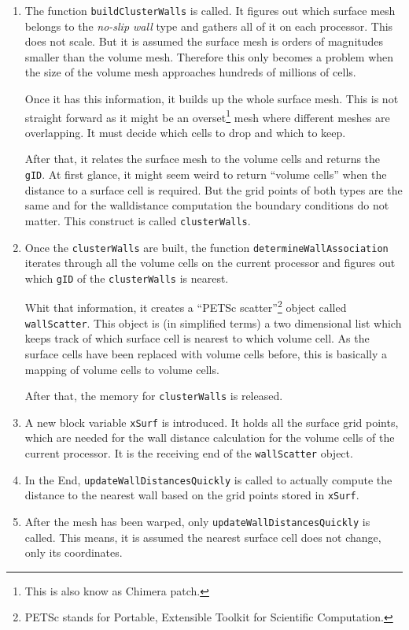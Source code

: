 \begin{enumerate}
  \item The function \texttt{buildClusterWalls} is called. It figures out which
surface mesh belongs to the \textit{no-slip wall} type and gathers all of it on
each processor. This does not scale. But it is assumed the surface mesh is
orders of magnitudes smaller than the volume mesh. Therefore this only becomes a
problem when the size of the volume mesh approaches hundreds of millions of
cells.

Once it has this information, it builds up the whole surface mesh. This is not
straight forward as it might be an overset\footnote{This is also know as Chimera
patch.} mesh where different meshes are overlapping. It must decide
which cells to drop and which to keep.

After that, it relates the surface mesh to the volume cells and returns the
\texttt{gID}. At first glance, it might seem weird to return ``volume cells''
when the distance to a surface cell is required. But the grid points of both
types are the same and for the walldistance computation the boundary conditions
do not matter. This construct is called \texttt{clusterWalls}.

  \item Once the \texttt{clusterWalls} are built, the function
\texttt{determineWallAssociation} iterates through all the volume cells on the
current processor and figures out which \texttt{gID} of the
\texttt{clusterWalls} is nearest.

Whit that information, it creates a ``PETSc scatter''\footnote{PETSc stands for
Portable, Extensible Toolkit for Scientific Computation.} object called
\texttt{wallScatter}. This object is (in simplified terms) a two dimensional
list which keeps track of which surface cell is nearest to which volume cell. As
the surface cells have been replaced with volume cells before, this is basically
a mapping of volume cells to volume cells.

After that, the memory for \texttt{clusterWalls} is released.

\item A new block variable \texttt{xSurf} is introduced. It holds all the
surface grid points, which are needed for the wall distance calculation for the
volume cells of the current processor. It is the receiving end of the
\texttt{wallScatter} object.

\item In the End, \texttt{updateWallDistancesQuickly} is called to actually
compute the distance to the nearest wall based on the grid points stored in
\texttt{xSurf}.

\item After the mesh has been warped, only \texttt{updateWallDistancesQuickly}
is called. This means, it is assumed the nearest surface cell does not
change, only its coordinates.
\end{enumerate}

